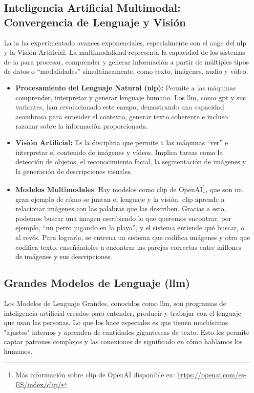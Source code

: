 \subsection{Inteligencia Artificial Multimodal: Convergencia de Lenguaje y Visión}
La \gls{ia} ha experimentado avances exponenciales, especialmente con el auge del \gls{nlp} y la Visión Artificial. La multimodalidad representa la capacidad de los sistemas de \gls{ia} para procesar, comprender y generar información a partir de múltiples tipos de datos o ``modalidades'' simultáneamente, como texto, imágenes, audio y vídeo.
\begin{itemize}
    \item \textbf{Procesamiento del Lenguaje Natural (\gls{nlp}):} Permite a las máquinas comprender, interpretar y generar lenguaje humano. Los \gls{llm}, como \gls{gpt} y sus variantes, han revolucionado este campo, demostrando una capacidad asombrosa para entender el contexto, generar texto coherente e incluso razonar sobre la información proporcionada.
    \item \textbf{Visión Artificial:} Es la disciplina que permite a las máquinas ``ver'' e interpretar el contenido de imágenes y vídeos. Implica tareas como la detección de objetos, el reconocimiento facial, la segmentación de imágenes y la generación de descripciones visuales.
    \item \textbf{Modelos Multimodales}: Hay modelos como \gls{clip} de OpenAI\footnote{Más información sobre \gls{clip} de OpenAI disponible en: \url{https://openai.com/es-ES/index/clip/}}, que son un gran ejemplo de cómo se juntan el lenguaje y la visión. \gls{clip} aprende a relacionar imágenes con las palabras que las describen. Gracias a esto, podemos buscar una imagen escribiendo lo que queremos encontrar, por ejemplo, ``un perro jugando en la playa'', y el sistema entiende qué buscar, o al revés. Para lograrlo, se entrena un sistema que codifica imágenes y otro que codifica texto, enseñándoles a encontrar las parejas correctas entre millones de imágenes y sus descripciones.
\end{itemize}

\subsection{Grandes Modelos de Lenguaje (\gls{llm})}
Los Modelos de Lenguaje Grandes, conocidos como \gls{llm}, son programas de inteligencia artificial creados para entender, producir y trabajar con el lenguaje que usan las personas. Lo que los hace especiales es que tienen muchísimos "ajustes" internos y aprenden de cantidades gigantescas de texto. Esto les permite captar patrones complejos y las conexiones de significado en cómo hablamos los humanos.

